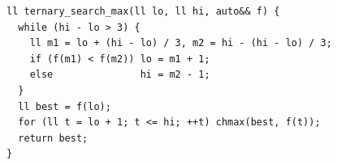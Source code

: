 \begin{lstlisting}
ll ternary_search_max(ll lo, ll hi, auto&& f) {
  while (hi - lo > 3) {
    ll m1 = lo + (hi - lo) / 3, m2 = hi - (hi - lo) / 3;
    if (f(m1) < f(m2)) lo = m1 + 1;
    else               hi = m2 - 1;
  }
  ll best = f(lo);
  for (ll t = lo + 1; t <= hi; ++t) chmax(best, f(t));
  return best;
}
\end{lstlisting}
